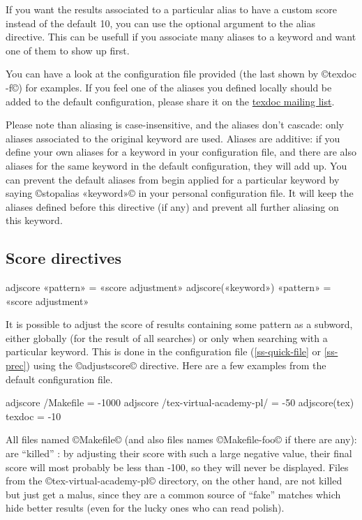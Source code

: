 \documentclass[a4paper, oneside]{scrartcl}
\makeatletter
\newenvironment{htcode}{%
  \SaveVerbatim[samepage, gobble=2]{verbmat}%
  }{%
  \endSaveVerbatim
  \par\medskip\noindent\hspace*{\parindent}%
  \BUseVerbatim{verbmat}%
  \par\medskip\@endpetrue}
\newcommand\tdml{\href{mailto:texdoc@tug.org}{texdoc mailing list}\xspace}
\makeatother
\begin{document}
If you want the results associated to a particular alias to have a custom
score instead of the default 10, you can use the optional argument to the
alias directive. This can be usefull if you associate many aliases to
a keyword and want one of them to show up first.

You can have a look at the configuration file provided (the last shown by
©texdoc -f©) for examples.  If you feel one of the aliases you defined locally
should be added to the default configuration, please share it on the \tdml.

Please note than aliasing is case-insensitive, and the aliases don't cascade:
only aliases associated to the original keyword are used.
Aliases are additive: if you define your own aliases for a keyword in your
configuration file, and there are also aliases for the same keyword in the
default configuration, they will add up. You can prevent the default aliases
from begin applied for a particular keyword by saying ©stopalias «keyword»© in
your personal configuration file. It will keep the aliases defined before
this directive (if any) and prevent all further aliasing on this keyword.

\subsection{Score directives}\label{ss-score}

\begin{htcode}
  adjscore «pattern» = «score adjustment»
  adjscore(«keyword») «pattern» = «score adjustment»
\end{htcode}

It is possible to adjust the score of results containing some pattern as a
subword, either globally (for the result of all searches) or only 
when searching with a particular keyword. This is done in the
configuration file (\ref{ss-quick-file} or \ref{ss-prec}) using the 
©adjustscore© directive. Here are a few examples from the default
configuration file.

\begin{htcode}
  adjscore /Makefile = -1000
  adjscore /tex-virtual-academy-pl/ = -50
  adjscore(tex) texdoc = -10
\end{htcode}

All files named ©Makefile© (and also files names ©Makefile-foo© if there are
any): are ``killed'' : by adjusting their score with such a large negative
value, their final score will most probably be less than -100, so they will
never be displayed. Files from the ©tex-virtual-academy-pl© directory, on the
other hand, are not killed but just get a malus, since they are a common
source of ``fake'' matches which hide better results (even for the lucky ones
who can read polish).
\end{document}
